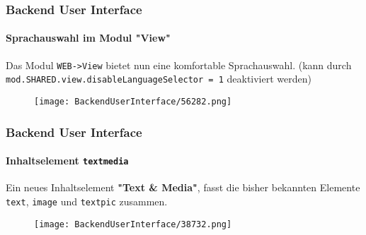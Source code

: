 %
\begin{frame}[fragile]
	\frametitle{Backend User Interface}
	\framesubtitle{Sprachauswahl im Modul "View"}

	Das Modul \texttt{WEB->View} bietet nun eine komfortable Sprachauswahl.\newline
	\smaller
		(kann durch \texttt{mod.SHARED.view.disableLanguageSelector = 1} deaktiviert werden)
	\normalsize

	\begin{figure}
		\texttt{[image: BackendUserInterface/56282.png]}
	\end{figure}

\end{frame}

\begin{frame}[fragile]
	\frametitle{Backend User Interface}
	\framesubtitle{Inhaltselement \texttt{textmedia}}

	Ein neues Inhaltselement \textbf{"Text \& Media"}, fasst die bisher bekannten
	Elemente \texttt{text}, \texttt{image} und \texttt{textpic} zusammen.

	\begin{figure}
		\texttt{[image: BackendUserInterface/38732.png]}
	\end{figure}

\end{frame}

